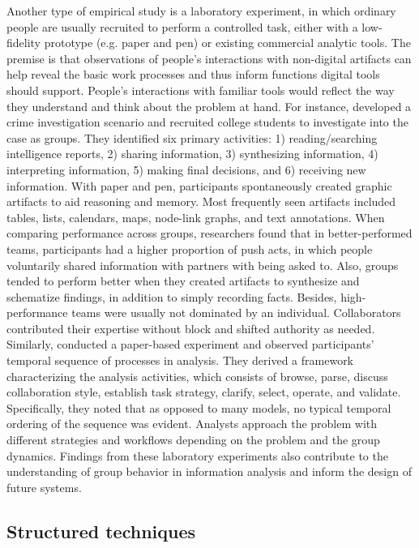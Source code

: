 Another type of empirical study is a laboratory
experiment, in which ordinary people are usually recruited to perform a
controlled task, either with a low-fidelity prototype (e.g. paper and pen) or
existing commercial analytic tools. The premise is that observations of people’s
interactions with non-digital artifacts can help reveal the basic work processes
and thus inform functions digital tools should support. People’s interactions
with familiar tools would reflect the way they understand and think about the
problem at hand. For instance, \cite{Borge2012,Carroll2013} developed a crime investigation scenario and recruited
college students to investigate into the case as groups. They identified six
primary activities: 1) reading/searching intelligence reports, 2) sharing
information, 3) synthesizing information, 4) interpreting information, 5) making
final decisions, and 6) receiving new information. With paper and pen,
participants spontaneously created graphic artifacts to aid reasoning and
memory. Most frequently seen artifacts included tables, lists, calendars, maps,
node-link graphs, and text annotations. When comparing performance across
groups, researchers found that in better-performed teams, participants had a
higher proportion of push acts, in which people voluntarily shared information
with partners with being asked to. Also, groups tended to perform better when
they created artifacts to synthesize and schematize findings, in addition to
simply recording facts. Besides, high-performance teams were usually not dominated
by an individual. Collaborators contributed their expertise without block and
shifted authority as needed. Similarly, \cite{Isenberg2008b} conducted a paper-based experiment and observed participants’
temporal sequence of processes in analysis. They derived a framework
characterizing the analysis activities, which consists of browse, parse, discuss
collaboration style, establish task strategy, clarify, select, operate, and
validate. Specifically, they noted that as opposed to many models, no typical
temporal ordering of the sequence was evident. Analysts approach the problem
with different strategies and workflows depending on the problem and the group
dynamics. Findings from these laboratory experiments also contribute to the
understanding of group behavior in information analysis and inform the design of
future systems. 


\subsection{Structured techniques}

